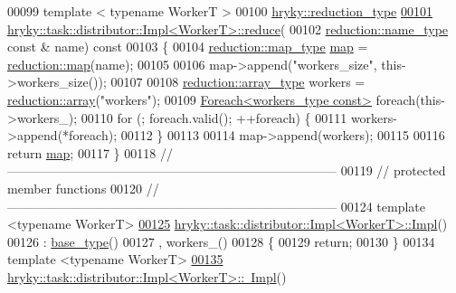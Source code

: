 \begin{DoxyCode}
00099 \textcolor{comment}{}\textcolor{keyword}{template} < \textcolor{keyword}{typename} WorkerT >
00100 \hyperlink{classhryky_1_1_intrusive_ptr}{hryky::reduction_type}
\hypertarget{task__distributor__impl_8h_source_l00101}{}\hyperlink{group__task_ga0170ebe627b3f2a67912e5b237994b9d}{00101} \hyperlink{group__task_ga0170ebe627b3f2a67912e5b237994b9d}{hryky::task::distributor::Impl<WorkerT>::reduce}(
00102     \hyperlink{classhryky_1_1reduction_1_1_string}{reduction::name_type} \textcolor{keyword}{const} & name)\textcolor{keyword}{ const}
00103 \textcolor{keyword}{}\{
00104     \hyperlink{classhryky_1_1_intrusive_ptr}{reduction::map_type} \hyperlink{namespacehryky_1_1reduction_ac5eae270cf8047b294dc4ff3e5e11a79}{map} = \hyperlink{namespacehryky_1_1reduction_ac5eae270cf8047b294dc4ff3e5e11a79}{reduction::map}(name);
00105 
00106     map->append(\textcolor{stringliteral}{"workers\_size"}, this->workers\_size());
00107 
00108     \hyperlink{classhryky_1_1_intrusive_ptr}{reduction::array_type} workers = \hyperlink{namespacehryky_1_1reduction_a9d45a4dc1ea9a6668ebd192f296f788c}{reduction::array}(\textcolor{stringliteral}{"workers"});
00109     \hyperlink{classhryky_1_1_foreach}{Foreach<workers_type const>} \textcolor{keywordflow}{foreach}(this->workers\_);
00110     \textcolor{keywordflow}{for} (; \textcolor{keywordflow}{foreach}.valid(); ++\textcolor{keywordflow}{foreach}) \{
00111         workers->append(*\textcolor{keywordflow}{foreach});
00112     \}
00113 
00114     map->append(workers);
00115 
00116     \textcolor{keywordflow}{return} \hyperlink{namespacehryky_1_1reduction_ac5eae270cf8047b294dc4ff3e5e11a79}{map};
00117 \}
00118 \textcolor{comment}{//
      ------------------------------------------------------------------------------}
00119 \textcolor{comment}{// protected member functions}
00120 \textcolor{comment}{//
      ------------------------------------------------------------------------------}
00124 \textcolor{comment}{}\textcolor{keyword}{template} <\textcolor{keyword}{typename} WorkerT>
\hypertarget{task__distributor__impl_8h_source_l00125}{}\hyperlink{group__task_gaa414ac5e76735f881871f98e288003e0}{00125} \hyperlink{group__task_gaa414ac5e76735f881871f98e288003e0}{hryky::task::distributor::Impl<WorkerT>::Impl}()
00126     : \hyperlink{classhryky_1_1task_1_1distributor_1_1_base}{base_type}()
00127       , workers\_()
00128 \{
00129     \textcolor{keywordflow}{return};
00130 \}
00134 \textcolor{keyword}{template} <\textcolor{keyword}{typename} WorkerT>
\hypertarget{task__distributor__impl_8h_source_l00135}{}\hyperlink{group__task_gae688f82c064cc006f0eba491339faca1}{00135} \hyperlink{classhryky_1_1task_1_1distributor_1_1_impl}{hryky::task::distributor::Impl<WorkerT>::~Impl}()

\end{DoxyCode}
